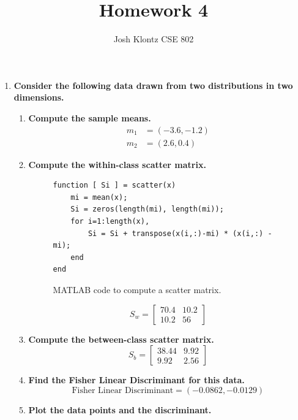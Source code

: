 \documentclass[12pt]{article}
\begin{document}
 
\title{Homework 4}
\author{Josh Klontz
CSE 802}
 
\maketitle

\begin{enumerate}
\item \textbf{Consider the following data drawn from two distributions in two dimensions.}
\begin{enumerate}
\item \textbf{Compute the sample means.}
\begin{equation}
\begin{split}
m_1& = (-3.6, -1.2) \\
m_2& = (2.6, 0.4)
\end{split}
\end{equation}
\item \textbf{Compute the within-class scatter matrix.}
\begin{figure}[H]
\begin{verbatim}
function [ Si ] = scatter(x)
    mi = mean(x);
    Si = zeros(length(mi), length(mi));
    for i=1:length(x),
        Si = Si + transpose(x(i,:)-mi) * (x(i,:) - mi);
    end
end
\end{verbatim}
\caption{MATLAB code to compute a scatter matrix.}
\end{figure}
\begin{equation}
S_w = \left[ \begin{array}{cc} 70.4 & 10.2 \\ 10.2 & 56 \end{array} \right]
\end{equation}
\item \textbf{Compute the between-class scatter matrix.}
\begin{equation}
S_b = \left[ \begin{array}{cc} 38.44 & 9.92 \\ 9.92 & 2.56 \end{array} \right]
\end{equation}
\item \textbf{Find the Fisher Linear Discriminant for this data.}
\begin{equation}
\text{Fisher Linear Discriminant} = (-0.0862, -0.0129)
\end{equation}
\item \textbf{Plot the data points and the discriminant.}
\begin{figure}[H]

\end{figure}
\end{enumerate}
\end{enumerate}
\end{document}
